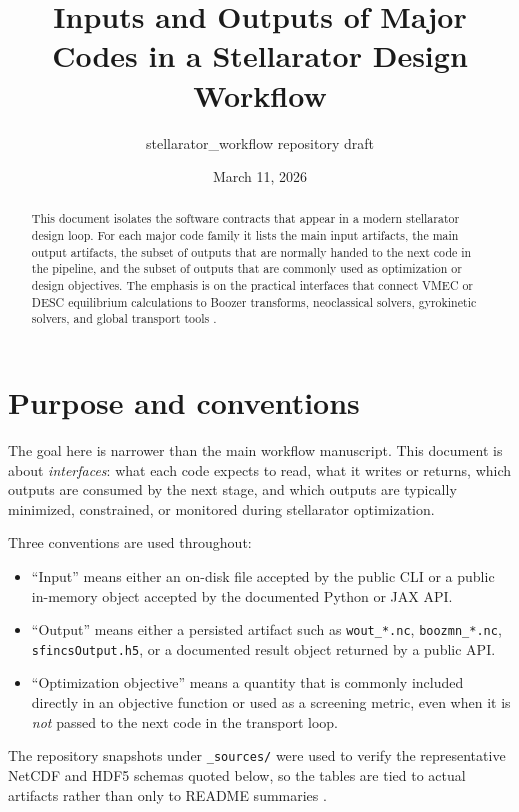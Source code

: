 \documentclass[11pt]{article}
\title{Inputs and Outputs of Major Codes in a Stellarator Design Workflow}
\author{stellarator\_workflow repository draft}
\date{March 11, 2026}
\newcommand{\code}[1]{\texttt{#1}}
\begin{document}
\maketitle

\begin{abstract}
This document isolates the software contracts that appear in a modern
stellarator design loop. For each major code family it lists the main input
artifacts, the main output artifacts, the subset of outputs that are normally
handed to the next code in the pipeline, and the subset of outputs that are
commonly used as optimization or design objectives. The emphasis is on the
practical interfaces that connect VMEC or DESC equilibrium calculations to
Boozer transforms, neoclassical solvers, gyrokinetic solvers, and global
transport tools \citep{HirshmanWhitson1983,DudtKolemen2020,Boozer1983,Landreman2014SFINCS,Mandell2024GX,BanonNavarro2023}.
\end{abstract}

\tableofcontents

\section{Purpose and conventions}

The goal here is narrower than the main workflow manuscript. This document is
about \emph{interfaces}: what each code expects to read, what it writes or
returns, which outputs are consumed by the next stage, and which outputs are
typically minimized, constrained, or monitored during stellarator optimization.

Three conventions are used throughout:

\begin{itemize}
  \item ``Input'' means either an on-disk file accepted by the public CLI or a
  public in-memory object accepted by the documented Python or JAX API.
  \item ``Output'' means either a persisted artifact such as \code{wout\_*.nc},
  \code{boozmn\_*.nc}, \code{sfincsOutput.h5}, or a documented result object
  returned by a public API.
  \item ``Optimization objective'' means a quantity that is commonly included
  directly in an objective function or used as a screening metric, even when it
  is \emph{not} passed to the next code in the transport loop.
\end{itemize}

The repository snapshots under \code{\_sources/} were used to verify the
representative NetCDF and HDF5 schemas quoted below, so the tables are tied to
actual artifacts rather than only to README summaries
\citep{VMECRepo,VMECJaxRepo,DESCRepo,BoozXformRepo,BoozXformJaxRepo,NEORepo,NEOJaxRepo,SFINCSRepo,SFINCSJaxRepo,MONKESRepo,GXRepo,SpectraxGKRepo,TrinityDocs,NEOPAXRepo}.
\end{document}

